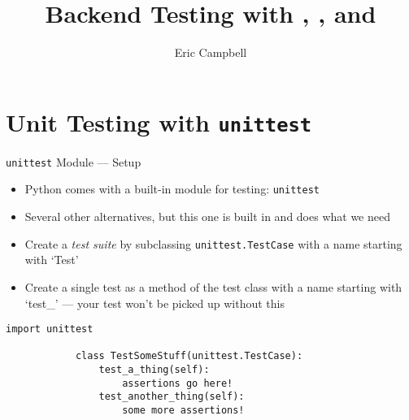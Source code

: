 \documentclass[t]{beamer}
\title{Backend Testing with \code{unittest}, \code{Django}, and \code{Graphene}}
\author{Eric Campbell}
\date{}
\newcommand{\code}[1]{\texttt{#1}}
\begin{document}
	\begin{frame}
		\maketitle
	\end{frame}

	\section{Unit Testing with \code{unittest}}

	\begin{frame}[fragile]{\code{unittest} Module --- Setup}
		\begin{itemize}
			\item Python comes with a built-in module for testing: \code{unittest}
			\item Several other alternatives, but this one is built in and does what we need
			\item Create a \emph{test suite} by subclassing \code{unittest.TestCase} with a name starting with `Test'
			\item Create a single test as a method of the test class with a name starting with `test\_' --- your test won't be picked up without this
		\end{itemize}
		\begin{lstlisting}[style=python, autogobble]
			import unittest

			class TestSomeStuff(unittest.TestCase):
				test_a_thing(self):
					assertions go here!
				test_another_thing(self):
					some more assertions!
		\end{lstlisting}
	\end{frame}
\end{document}
